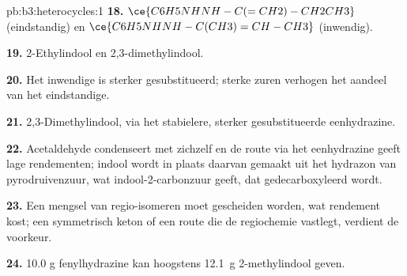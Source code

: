 \begin{solution}{pb:b3:heterocycles:1}
\textbf{18.} $\ce{C6H5NHNH-C(=CH2)-CH2CH3}$ (eindstandig) en $\ce{C6H5NHNH-C(CH3)=CH-CH3}$ (inwendig).

\textbf{19.} 2-Ethylindool en 2,3-dimethylindool.

\textbf{20.} Het inwendige is sterker gesubstitueerd; sterke zuren verhogen
het aandeel van het eindstandige.

\textbf{21.} 2,3-Dimethylindool, via het stabielere, sterker gesubstitueerde
eenhydrazine.

\textbf{22.} Acetaldehyde condenseert met zichzelf en de route via het
eenhydrazine geeft lage rendementen; indool wordt in plaats daarvan
gemaakt uit het hydrazon van pyrodruivenzuur, wat
indool-2-carbonzuur geeft, dat gedecarboxyleerd wordt.

\textbf{23.} Een mengsel van regio-isomeren moet gescheiden worden, wat
rendement kost; een symmetrisch keton of een route die de regiochemie
vastlegt, verdient de voorkeur.

\textbf{24.} 10.0 g fenylhydrazine kan hoogstens \qty{12.1}{g} 2-methylindool geven.
\end{solution}

